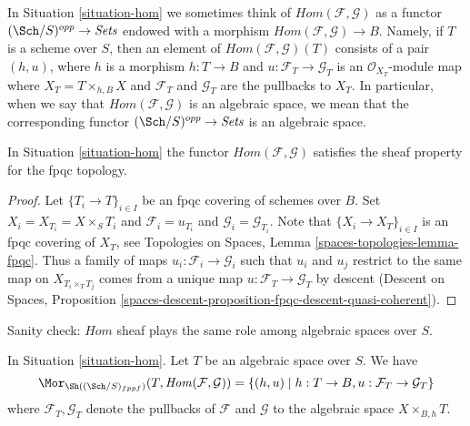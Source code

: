 \noindent
In Situation \ref{situation-hom} we sometimes think of
$\mathit{Hom}(\mathcal{F}, \mathcal{G})$ as a functor
$(\Sch/S)^{opp} \to \textit{Sets}$
endowed with a morphism
$\mathit{Hom}(\mathcal{F}, \mathcal{G}) \to B$.
Namely, if $T$ is a scheme over $S$, then an element of
$\mathit{Hom}(\mathcal{F}, \mathcal{G})(T)$ consists of a pair
$(h, u)$, where $h$ is a morphism $h : T \to B$ and
$u : \mathcal{F}_T \to \mathcal{G}_T$ is an $\mathcal{O}_{X_T}$-module
map where $X_T = T \times_{h, B} X$ and $\mathcal{F}_T$ and $\mathcal{G}_T$
are the pullbacks to $X_T$. In particular, when we say
that $\mathit{Hom}(\mathcal{F}, \mathcal{G})$ is an algebraic space,
we mean that the corresponding functor
$(\Sch/S)^{opp} \to \textit{Sets}$ is an algebraic space.

\begin{lemma}
\label{lemma-hom-sheaf}
In Situation \ref{situation-hom} the functor
$\mathit{Hom}(\mathcal{F}, \mathcal{G})$ 
satisfies the sheaf property for the fpqc topology.
\end{lemma}

\begin{proof}
Let $\{T_i \to T\}_{i \in I}$ be an fpqc covering of schemes over $B$.
Set $X_i = X_{T_i} = X \times_S T_i$ and $\mathcal{F}_i = u_{T_i}$
and $\mathcal{G}_i = \mathcal{G}_{T_i}$.
Note that $\{X_i \to X_T\}_{i \in I}$ is an fpqc covering of $X_T$, see
Topologies on Spaces, Lemma \ref{spaces-topologies-lemma-fpqc}.
Thus a family of maps $u_i : \mathcal{F}_i \to \mathcal{G}_i$
such that $u_i$ and $u_j$ restrict to the same map on
$X_{T_i \times_T T_j}$ comes from a unique map
$u : \mathcal{F}_T \to \mathcal{G}_T$ by descent
(Descent on Spaces, Proposition
\ref{spaces-descent-proposition-fpqc-descent-quasi-coherent}).
\end{proof}

\noindent
Sanity check: $\mathit{Hom}$ sheaf plays the same role among algebraic spaces
over $S$.

\begin{lemma}
\label{lemma-extend-hom-to-spaces}
In Situation \ref{situation-hom}. Let $T$ be an algebraic space over $S$.
We have
$$
\Mor_{\Sh((\Sch/S)_{fppf})}(T, \mathit{Hom}(\mathcal{F}, \mathcal{G})) =
\{(h, u) \mid h : T \to B, u : \mathcal{F}_T \to \mathcal{G}_T\}
$$
where $\mathcal{F}_T, \mathcal{G}_T$ denote the pullbacks of $\mathcal{F}$
and $\mathcal{G}$ to the algebraic space $X \times_{B, h} T$.
\end{lemma}

